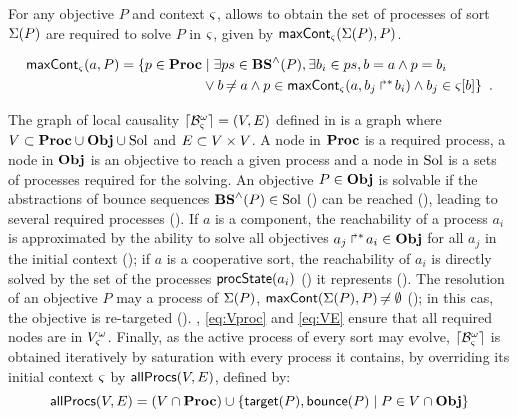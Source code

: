 For any objective $P$ and context $\varsigma$,  allows to obtain the set of processes of sort $\Sigma(P)$ are required to solve $P$ in $\varsigma$, given by $\mathsf{maxCont}_\varsigma(\Sigma(P), P)$.
\begin{definition}[$\gCont_\ctx : \Sigma \times \Obj \rightarrow \powerset(\PHproc)$]
  \label{def:maxCont}
  \begin{align*}
    \mathsf{maxCont}_\varsigma(a,P) = 
    \{ p \in \mathbf{Proc} &\mid \exists ps \in \mathbf{BS}^\wedge(P), \exists b_i \in ps, b = a \wedge p = b_i \\
      & \vee b \not\nobreak\mkern -2mu = a \wedge p \in \mathsf{maxCont}_\varsigma(a, \mbox{$b_j\Rsh^*\!b_i$}) \wedge b_j \in {\varsigma[b]} \}
    \enspace.
  \end{align*}
\end{definition}

The graph of local causality $\lceil \mathcal{B}_\varsigma^\omega\rceil = (V, E)$ defined in  is a graph where $V \subset \mathbf{Proc} \cup \mathbf{Obj} \cup \mathrm{Sol}$ and $E \subset V \times V$.
A node in $\mathbf{Proc}$ is a required process,
a node in $\mathbf{Obj}$ is an objective to reach a given process
and a node in $\mathrm{Sol}$ is a sets of processes required for the solving.
An objective $P \in \mathbf{Obj}$ is solvable if the abstractions of bounce sequences $\mathbf{BS}^\wedge(P) \in \mathrm{Sol}$ () can be reached (), leading to several required processes ().
If $a$ is a component, the reachability of a process $a_i$ is approximated by the ability to solve all objectives $\mbox{${a}_{j}\Rsh^*\!{a}_{i}$} \in \mathbf{Obj}$ for all $a_j$ in the initial context ();
if $a$ is a cooperative sort, the reachability of $a_i$ is directly solved by the set of the processes $\mathsf{procState}(a_i)$ () it represents ().
The resolution of an objective $P$ may a process of $\Sigma(P)$, \ie $\mathsf{maxCont}(\Sigma(P), P) \not\nobreak\mkern -2mu = \emptyset$ (); in this cas, the objective is re-targeted ().
, \eqref{eq:Vproc} and \eqref{eq:VE} ensure that all required nodes are in $V_\varsigma^\omega$.
Finally, as the active process of every sort may evolve, $\lceil \mathcal{B}_\varsigma^\omega\rceil$ is obtained iteratively by saturation with every process it contains,
\ie by overriding its initial context $\varsigma$ by $\mathsf{allProcs}(V, E)$, defined by:
$$\mathsf{allProcs}(V, E) = (V \cap \mathbf{Proc}) \cup \{ \mathsf{target}(P), \mathsf{bounce}(P) \mid P \in V \cap \mathbf{Obj} \}$$

